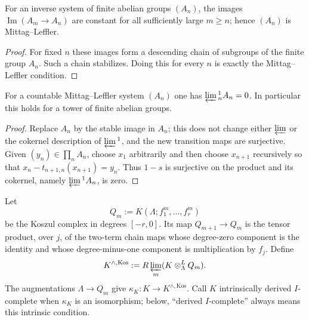 \begin{lemma}
\label{lemma:weil-pbc-adic-mittag-leffler}
\uses{}
For an inverse system of finite abelian groups $(A_n)$, the images
$\operatorname{Im}(A_m\to A_n)$ are constant for all sufficiently large
$m\geq n$; hence $(A_n)$ is Mittag--Leffler.
\end{lemma}
\begin{proof}
\uses{} 
For fixed $n$ these images form a descending chain of subgroups of the
finite group $A_n$.  Such a chain stabilizes.  Doing this for every $n$ is
exactly the Mittag--Leffler condition.
\end{proof}

\begin{lemma}
\label{lemma:weil-pbc-adic-lim-one-zero}
\uses{}

For a countable Mittag--Leffler system $(A_n)$ one has
$\varprojlim{}^1_nA_n=0$.  In particular this holds for a tower of finite
abelian groups.
\end{lemma}
\begin{proof}

Replace $A_n$ by the stable image in $A_n$; this does not change either
$\varprojlim$ or the cokernel description of $\varprojlim{}^1$, and the new
transition maps are surjective.  Given $(y_n)\in\prod_nA_n$, choose $x_1$
arbitrarily and then choose $x_{n+1}$ recursively so that
$x_n-t_{n+1,n}(x_{n+1})=y_n$.  Thus $1-s$ is surjective on the product and
its cokernel, namely $\varprojlim{}^1A_n$, is zero.
\end{proof}

\begin{definition}
\label{def:weil-pbc-intrinsic-koszul-completion}
Let
\[
 Q_m:=K(\Lambda;f_1^m,\ldots,f_r^m)
\]
be the Koszul complex in degrees $[-r,0]$.  Its map $Q_{m+1}\to Q_m$ is
the tensor product, over $j$, of the two-term chain maps whose degree-zero
component is the identity and whose degree-minus-one component is
multiplication by $f_j$.  Define
\[
 K^{\wedge,\mathrm{Kos}}:=
 R\varprojlim_m(K\otimes^L_\Lambda Q_m).
\]
The augmentations $\Lambda\to Q_m$ give
$\kappa_K:K\to K^{\wedge,\mathrm{Kos}}$.  Call $K$ intrinsically derived
$I$-complete when $\kappa_K$ is an isomorphism; below, ``derived
$I$-complete'' always means this intrinsic condition.
\end{definition}

